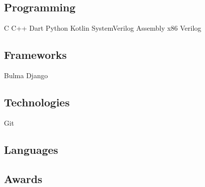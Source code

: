 \documentclass[]{deedy-resume-openfont}
\begin{document}
\begin{minipage}[t]{0.33\textwidth}
\subsection{Programming}
 C \textbullet{} C++ \textbullet{} Dart\textbullet{} Python \newline
{}
\vspace{1mm}
Kotlin \textbullet{} SystemVerilog \newline Assembly x86 \textbullet{} Verilog
\vspace{3mm} %


\subsection{Frameworks}
Bulma \textbullet{} Django
\vspace{3mm}

\subsection{Technologies}
Git
\vspace{3mm}

\subsection{Languages}
\vspace{3mm}

\subsection{Awards}
\textbullet {}

\sectionsep



%
%

\end{minipage} 
\end{document}
